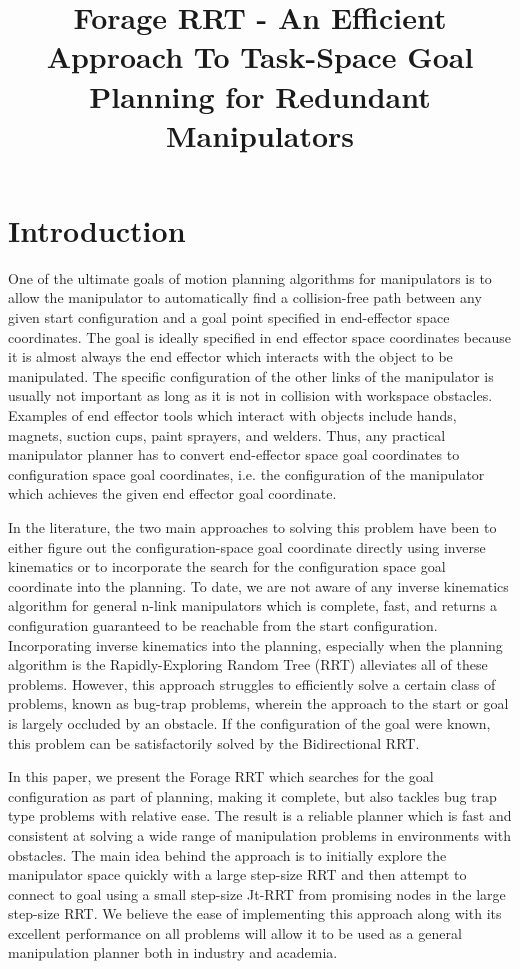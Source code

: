\documentclass[conference]{IEEEtran}
\begin{document}
\title{Forage RRT - An Efficient Approach To Task-Space Goal Planning for Redundant Manipulators}
\maketitle
\section{Introduction}
One of the ultimate goals of motion planning algorithms for manipulators is to allow the manipulator to automatically find a collision-free
path between any given start configuration and a goal point specified in end-effector space coordinates. The goal is ideally specified in
end effector space coordinates because it is almost always the end effector which interacts with the object to be manipulated. The specific
configuration of the other links of the manipulator is usually not important as long as it is not in collision with workspace obstacles.
Examples of end effector tools which interact with objects include hands, magnets, suction cups, paint sprayers, and welders. Thus, any
practical manipulator planner has to convert end-effector space goal coordinates to configuration space goal coordinates, i.e. the
configuration of the manipulator which achieves the given end effector goal coordinate.

In the literature, the two main approaches to solving this problem have been to either figure out the configuration-space goal coordinate
directly using inverse kinematics or to incorporate the search for the configuration space goal coordinate into the planning. To date, we
are not aware of any inverse kinematics algorithm for general n-link manipulators which is complete, fast, and returns a configuration
guaranteed to be reachable from the start configuration. Incorporating inverse kinematics into the planning, especially when the planning
algorithm is the Rapidly-Exploring Random Tree (RRT) alleviates all of these problems. However, this approach struggles to efficiently solve
a certain class of problems, known as bug-trap problems, wherein the approach to the start or goal is largely occluded by an obstacle. If
the configuration of the goal were known, this problem can be satisfactorily solved by the Bidirectional RRT. 

In this paper, we present the Forage RRT which searches for the goal configuration as part of planning, making it complete, but also tackles
bug trap type problems with relative ease. The result is a reliable planner which is fast and consistent at solving a wide range of
manipulation problems in environments with obstacles. The main idea behind the approach is to initially explore the manipulator space
quickly with a large step-size RRT and then attempt to connect to goal using a small step-size Jt-RRT from promising nodes in the large
step-size RRT. We believe the ease of implementing this approach along with its excellent performance on all problems will allow it to be
used as a general manipulation planner both in industry and academia.
\end{document}
